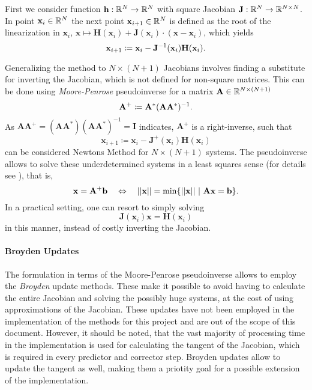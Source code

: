 First we consider function $\mathbf h: \mathbb{R}^N \to \mathbb{R}^N$ with square Jacobian $\mathbf J: \mathbb{R}^N \to \mathbb{R}^{N \times N}$.
In point $\mathbf x_i \in \mathbb{R}^N$ the next point $\mathbf x_{i+1} \in \mathbb{R}^N$ is defined as the root of the linearization in $\mathbf x_i$, $\mathbf x \mapsto \mathbf H(\mathbf x_i) + \mathbf J(\mathbf x_i) \cdot (\mathbf x - \mathbf x_i)$, which yields
	\[
		\mathbf x_{i+1} \coloneqq \mathbf x_i - \mathbf J^{-1}(\mathbf x_i) \mathbf H(\mathbf x_i) \text.
	\]

Generalizing the method to $N \times (N+1)$ Jacobians involves finding a substitute for inverting the Jacobian, which is not defined for non-square matrices.
This can be done using \emph{Moore-Penrose} pseudoinverse for a matrix $\mathbf A \in \mathbb{R}^{N \times (N+1)}$
	\[
		\mathbf A^+ \coloneqq \mathbf A^*(\mathbf A \mathbf A^*)^{-1} \text.
	\]
As $\mathbf A \mathbf A^+ = (\mathbf A \mathbf A^*)(\mathbf A \mathbf A^*)^{-1} = \mathbf I$ indicates, $\mathbf A^+$ is a right-inverse, such that
	\[
		\mathbf x_{i+1} \coloneqq \mathbf x_i - \mathbf J^+(\mathbf x_i) \mathbf H(\mathbf x_i)
	\]
can be considered Newtons Method for $N\times (N+1)$ systems.
The pseudoinverse allows to solve these underdetermined systems in a least squares sense (for details see \cite{allgower1990numerical}), that is,
	\[
		\mathbf x = \mathbf A^+ \mathbf b \quad \Leftrightarrow \quad \mathbf ||\mathbf x|| = \min \{ ||\mathbf x||\ |\ \mathbf A \mathbf x = \mathbf b\} \text.
	\]
In a practical setting, one can resort to simply solving
	\[
		\mathbf J(\mathbf x_i) \mathbf x = \mathbf H(\mathbf x_i)
	\]
in this manner, instead of costly inverting the Jacobian.

\paragraph{Broyden Updates} The formulation in terms of the Moore-Penrose pseudoinverse allows to employ the \emph{Broyden} update methods.
These make it possible to avoid having to calculate the entire Jacobian and solving the possibly huge systems, at the cost of using approximations of the Jacobian.
These updates have not been employed in the implementation of the methods for this project and are out of the scope of this document.
However, it should be noted, that the vast majority of processing time in the implementation is used for calculating the tangent of the Jacobian, which is required in every predictor and corrector step.
Broyden updates allow to update the tangent as well, making them a priotity goal for a possible extension of the implementation.



